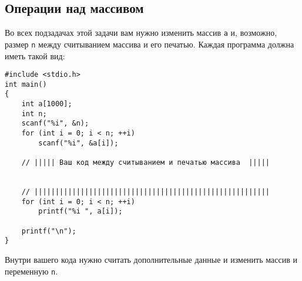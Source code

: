 \documentclass{article}
\begin{document}
\subsection{Операции над массивом}
Во всех подзадачах этой задачи вам нужно изменить массив \texttt{a} и, возможно, размер \texttt{n} между считыванием массива и его печатью. Каждая программа должна иметь такой вид:
\begin{lstlisting}
#include <stdio.h>
int main() 
{
    int a[1000];
    int n;
    scanf("%i", &n);
    for (int i = 0; i < n; ++i)
        scanf("%i", &a[i]);

    // ||||| Ваш код между считыванием и печатью массива  |||||
    
    
    // ||||||||||||||||||||||||||||||||||||||||||||||||||||||||
    for (int i = 0; i < n; ++i)
        printf("%i ", a[i]);

    printf("\n");
}
\end{lstlisting}
Внутри вашего кода нужно считать дополнительные данные и изменить массив и переменную \texttt{n}.
\end{document}
